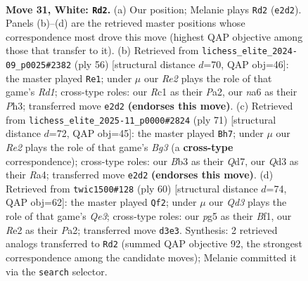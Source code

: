 \documentclass[11pt]{article}
\begin{document}
\clearpage

\begin{figure}[p]\centering
\begin{subfigure}{0.46\textwidth}\centering
\resizebox{\linewidth}{!}{%
\newchessgame
\chessboard[
  setfen={1rbq4/pp4k1/n5p1/2pP2pp/8/PB1Q1PP1/1P2RK1P/2R5 w - - 1 31},
  showmover=false,
  pgfstyle=straightmove, color=movearrow, markmove={e2-d2}
]}
\caption{}
\end{subfigure}\hfill
\begin{subfigure}{0.46\textwidth}\centering
\resizebox{\linewidth}{!}{%
\newchessgame
\chessboard[
  setfen={2r3k1/5p1n/q1pP1pp1/p4b2/B2P1B1p/2Q4P/P4PP1/3R2K1 w - - 1 29},
  showmover=false,
  pgfstyle=straightmove, color=movearrow, markmove={d1-e1}
]}
\caption{}
\end{subfigure}
\\[4pt]
\begin{subfigure}{0.46\textwidth}\centering
\resizebox{\linewidth}{!}{%
\newchessgame
\chessboard[
  setfen={8/3q1kp1/p4pbp/1p1p4/r2P3P/P1P1R1B1/Q4PPK/8 b - - 6 36},
  showmover=false,
  pgfstyle=straightmove, color=movearrow, markmove={g6-h7}
]}
\caption{}
\end{subfigure}\hfill
\begin{subfigure}{0.46\textwidth}\centering
\resizebox{\linewidth}{!}{%
\newchessgame
\chessboard[
  setfen={3r2k1/5bpp/1p1qnp2/p2p4/7P/1P2QP2/PB1R2P1/5BK1 w - - 9 31},
  showmover=false,
  pgfstyle=straightmove, color=movearrow, markmove={e3-f2}
]}
\caption{}
\end{subfigure}
\caption{\textbf{Move 31, White: \texttt{Rd2}.} (a) Our position; Melanie plays \texttt{Rd2} (\texttt{e2d2}). Panels (b)--(d) are the retrieved master positions whose correspondence most drove this move (highest QAP objective among those that transfer to it). (b) Retrieved from \texttt{lichess\_elite\_2024-09\_p0025\#2382} (ply 56) [structural distance $d$=70, QAP obj=46]: the master played \texttt{Re1}; under $\mu$ our \emph{Re2} plays the role of that game's \emph{Rd1}; cross-type roles: our \emph{R}c1 as their \emph{P}a2, our \emph{n}a6 as their \emph{P}h3; transferred move \texttt{e2d2} \textbf{(endorses this move)}. (c) Retrieved from \texttt{lichess\_elite\_2025-11\_p0000\#2824} (ply 71) [structural distance $d$=72, QAP obj=45]: the master played \texttt{Bh7}; under $\mu$ our \emph{Re2} plays the role of that game's \emph{Bg3} (a \textbf{cross-type} correspondence); cross-type roles: our \emph{B}b3 as their \emph{Q}d7, our \emph{Q}d3 as their \emph{R}a4; transferred move \texttt{e2d2} \textbf{(endorses this move)}. (d) Retrieved from \texttt{twic1500\#128} (ply 60) [structural distance $d$=74, QAP obj=62]: the master played \texttt{Qf2}; under $\mu$ our \emph{Qd3} plays the role of that game's \emph{Qe3}; cross-type roles: our \emph{p}g5 as their \emph{B}f1, our \emph{R}e2 as their \emph{P}a2; transferred move \texttt{d3e3}. Synthesis: 2 retrieved analogs transferred to \texttt{Rd2} (summed QAP objective 92, the strongest correspondence among the candidate moves); Melanie committed it via the \texttt{search} selector.}
\label{fig:thought-m60}
\end{figure}
\end{document}
